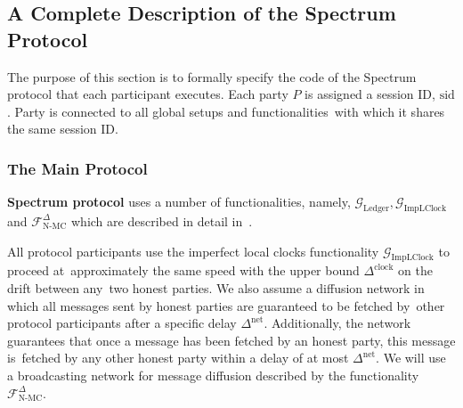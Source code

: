\subsection{A Complete Description of the Spectrum Protocol}\label{subsec:a-complete-description-of-the-spectrum-protocol}
The purpose of this section is to formally specify the code of the Spectrum protocol that each participant executes.
Each party $P$ is assigned a session ID, $\text{sid}$.
Party is connected to all global setups and functionalities\
with which it shares the same session ID\@.
%
%

\subsubsection{The Main Protocol}
\textbf{Spectrum protocol} uses a number of functionalities, namely, $\mathcal{G}_{\text{Ledger}},
\mathcal{G}_{\text{ImpLClock}}$ and $\mathcal{F}^{\Delta}_{\text{N-MC}}$ which are described in detail in~\cite{cryptoeprint:2019/838}.

All protocol participants use the imperfect local clocks functionality $\mathcal{G}_{\text{ImpLClock}}$ to proceed at\
approximately the same speed with the upper bound $\Delta^{\text{clock}}$ on the drift between any\
two honest parties.
We also assume a diffusion network in which all messages sent by honest parties are guaranteed to be fetched by\
other protocol participants after a specific delay $\Delta^{\text{net}}$.
Additionally, the network guarantees that once a message has been fetched by an honest party, this message is\
fetched by any other honest party within a delay of at most $\Delta^{\text{net}}$.
We will use a broadcasting network for message diffusion described by the functionality $\mathcal{F}^{\Delta}_{\text{N-MC}}$.

